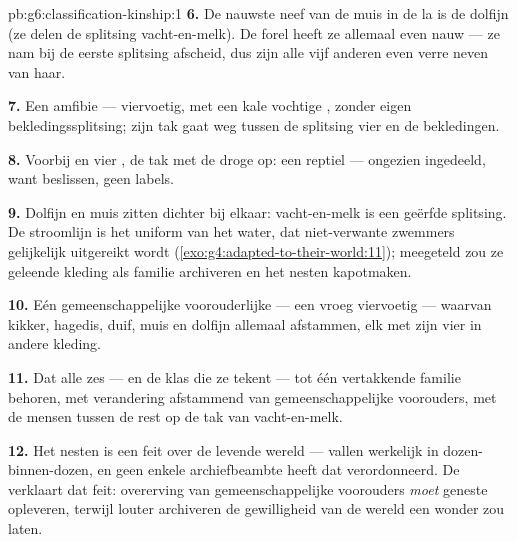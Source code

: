\begin{solution}{pb:g6:classification-kinship:1}
\textbf{6.} De nauwste neef van de muis in de la is de dolfijn (ze delen de
splitsing vacht-en-melk). De forel heeft ze allemaal even nauw --- ze nam
bij de eerste splitsing afscheid, dus zijn alle vijf anderen even verre
neven van haar.

\textbf{7.} Een amfibie --- viervoetig, met een kale vochtige , zonder
eigen bekledingssplitsing; zijn tak gaat weg tussen de splitsing vier
 en de bekledingen.

\textbf{8.} Voorbij  en vier , de tak met de droge
 op: een reptiel --- ongezien ingedeeld, want  beslissen,
geen labels.

\textbf{9.} Dolfijn en muis zitten dichter bij elkaar: vacht-en-melk is
een geërfde splitsing. De stroomlijn is het uniform van het water, dat
niet-verwante zwemmers gelijkelijk uitgereikt wordt
(\cref{exo:g4:adapted-to-their-world:11}); meegeteld zou ze geleende
kleding als familie archiveren en het nesten kapotmaken.

\textbf{10.} Eén gemeenschappelijke voorouderlijke  --- een vroeg
viervoetig  --- waarvan kikker, hagedis, duif, muis en
dolfijn allemaal afstammen, elk met zijn vier  in andere
kleding.

\textbf{11.} Dat alle zes --- en de klas die ze tekent --- tot één
vertakkende familie behoren, met verandering afstammend van
gemeenschappelijke voorouders, met de mensen tussen de rest op de tak van
vacht-en-melk.

\textbf{12.} Het nesten is een feit over de levende wereld --- 
vallen werkelijk in dozen-binnen-dozen, en geen enkele archiefbeambte
heeft dat verordonneerd. De  verklaart dat feit: overerving van
gemeenschappelijke voorouders \emph{moet} geneste  opleveren,
terwijl louter archiveren de gewilligheid van de wereld een wonder zou
laten.
\end{solution}
